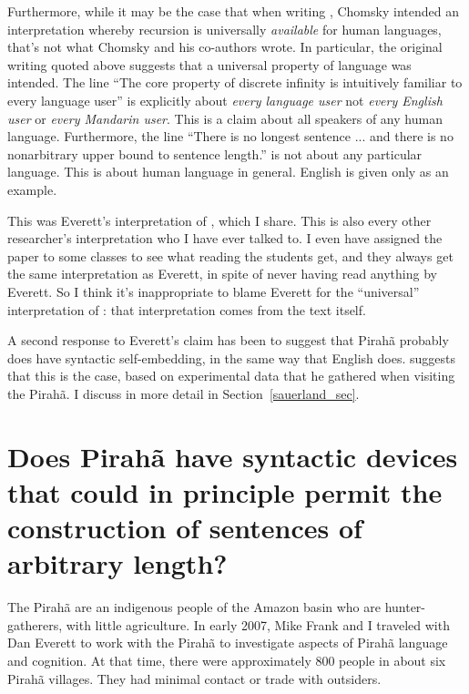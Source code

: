 \documentclass{article}
\begin{document}
Furthermore, while it may be the case that when writing \cite{hauser2002faculty}, Chomsky intended an interpretation whereby recursion is universally \textit{available} for human languages, that's not what Chomsky and his co-authors wrote.
In particular, the original writing quoted above suggests that a universal property of language was intended. The line ``The core property of discrete infinity is intuitively familiar to every language user'' is explicitly about \textit{every language user} not \textit{every English user} or \textit{every Mandarin user}.  This is a claim about all speakers of any human language. Furthermore, the line ``There is no longest sentence ... and there is no nonarbitrary upper bound to sentence length.'' is not about any particular language. This is about human language in general. English is given only as an example. 

This was Everett’s interpretation of \cite{hauser2002faculty}, which I share. This is also every other researcher’s interpretation who I have ever talked to. I even have assigned the \cite{hauser2002faculty} paper to some classes to see what reading the students get, and they always get the same interpretation as Everett, in spite of never having read anything by Everett.  So I think it’s inappropriate to blame Everett for the ``universal'' interpretation of \cite{hauser2002faculty}: that interpretation comes from the text itself. 

A second response to Everett’s claim has been to suggest that Pirahã probably does have syntactic self-embedding, in the same way that English does. \cite{sauerland2018false} suggests that this is the case, based on experimental data that he gathered when visiting the Pirahã. I discuss in more detail in Section~\ref{sauerland_sec}.

\section{Does Pirahã have  syntactic devices that could in principle permit the construction of sentences of arbitrary length?}

The Pirahã are an indigenous people of the Amazon basin who are hunter-gatherers, with little agriculture.  In early 2007, Mike Frank and I traveled with Dan Everett to work with the Pirahã to investigate aspects of Pirahã language and cognition. At that time, there were approximately 800 people in about six Pirahã villages. They had minimal contact or trade with outsiders. 
\end{document}

